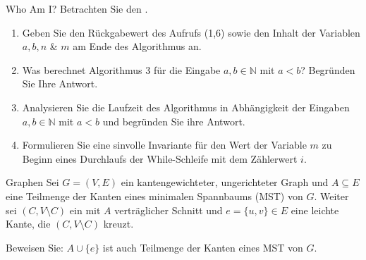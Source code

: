 \documentclass{article}
\begin{document}
\begin{exercise}{Who Am I?}
  Betrachten Sie den .
  
  \begin{enumerate}
    \item Geben Sie den Rückgabewert des Aufrufs (1,6) sowie den Inhalt der Variablen $a, b, n$ \& $m$ am Ende des Algorithmus an.
    \item Was berechnet Algorithmus 3 für die Eingabe $a, b \in \mathbb{N}$ mit $a < b$? Begründen Sie Ihre Antwort.
    \item Analysieren Sie die Laufzeit des Algorithmus in Abhängigkeit der Eingaben $a, b \in \mathbb{N}$ mit $a < b$ und begründen Sie ihre Antwort.
    \item Formulieren Sie eine sinvolle Invariante für den Wert der Variable $m$ zu Beginn eines Durchlaufs der While-Schleife mit dem Zählerwert $i$.
  \end{enumerate}
\end{exercise}

\begin{exercise}{Graphen}
  Sei $G = (V, E)$ ein kantengewichteter, ungerichteter Graph und $A \subseteq E$ eine Teilmenge der Kanten eines minimalen Spannbaums (MST) von $G$. Weiter sei $(C, V \setminus C)$ ein mit $A$ verträglicher Schnitt und $e = \{u, v\} \in E$ eine leichte Kante, die $(C, V \setminus C)$ kreuzt.\par
  Beweisen Sie: $A \cup \{e\}$ ist auch Teilmenge der Kanten eines MST von $G$.
\end{exercise}
\end{document}
